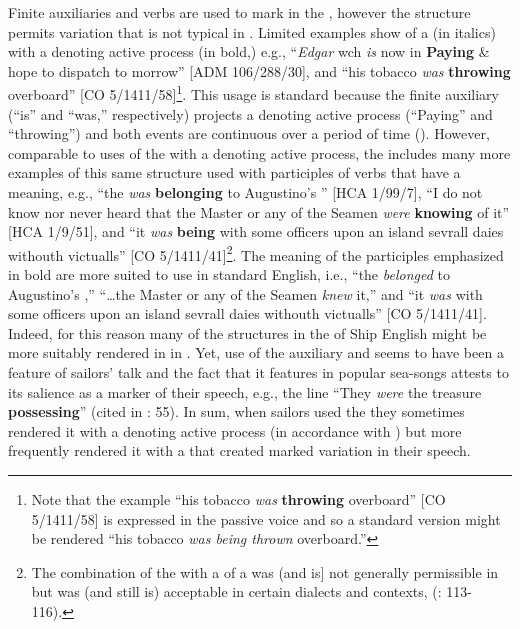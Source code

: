{\color{red}
Finite  auxiliaries and  verbs are used to mark  in the , however the structure permits variation that is not typical in . Limited examples show  of a  (in italics) with a   denoting active process (in bold,) e.g., “\textit{Edgar} wch \textit{is} now in \textbf{Paying} \& hope to dispatch to morrow” [ADM 106/288/30], and “his tobacco \textit{was} \textbf{throwing} overboard” [CO 5/1411/58]\footnote{Note that the example “his tobacco \textit{was} \textbf{throwing} overboard” [CO 5/1411/58] is expressed in the passive voice and so a standard version might be rendered “his tobacco \textit{was being thrown} overboard.”}. This usage is standard because the finite auxiliary (“is” and “was,” respectively) projects a  denoting active process (“Paying” and “throwing”) and both events are continuous over a period of time (\citealt{SILInternational2005}).
However, comparable to uses of the  with a  denoting active process, the  includes many more examples of this same structure used with participles of verbs that have a  meaning, e.g., “the  \textit{was} \textbf{belonging} to Augustino’s ” [HCA 1/99/7], “I do not know nor never heard that the Master or any of the Seamen \textit{were} \textbf{knowing} of it” [HCA 1/9/51], and “it \textit{was} \textbf{being} with some officers upon an island sevrall daies withouth victualls” [CO 5/1411/41]\footnote{The combination of the  with a  of a   was (and is] not generally permissible in  but was (and still is) acceptable in certain dialects and contexts, (\citealt{Römer2005}: 113-116).}. The  meaning of the participles emphasized in bold are more suited to   use in standard English, i.e., “the  \textit{belonged} to Augustino’s ,” “…the Master or any of the Seamen \textit{knew} it,” and “it \textit{was} with some officers upon an island sevrall daies withouth victualls” [CO 5/1411/41]. Indeed, for this reason many of the  structures in the  of Ship English might be more suitably rendered in   in . Yet, use of the  auxiliary and   seems to have been a feature of sailors’ talk and the fact that it features in popular sea-songs attests to its salience as a marker of their speech, e.g., the line “They \textit{were} the treasure \textbf{possessing}” (cited in \citealt{Palmer1986}: 55). In sum, when sailors used the  they sometimes rendered it with a  denoting active process (in accordance with ) but more frequently rendered it with a   that created marked variation in their speech. 

}
